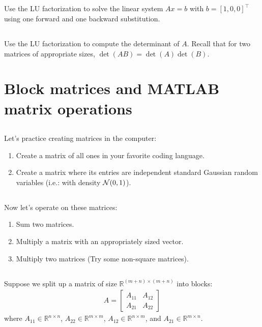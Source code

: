 \documentclass[11pt,letterpaper]{article}
\begin{document}
\subsection{}
Use the LU factorization to solve the linear system $Ax=b$ with
  $b=[1, 0, 0]^\top$ using one forward and one backward substitution.
  
\subsection{}\label{sec:1c}
Use the LU factorization to compute the determinant of
  $A$. Recall that for two matrices of appropriate sizes,
  $\det(AB)=\det(A)\det(B)$.
  

\newpage
\section{Block matrices and MATLAB matrix operations}
\subsection{}
Let's practice creating matrices in the computer:
\begin{enumerate}
    \item Create a matrix of all ones in your favorite coding language.
    \item Create a matrix where its entries are independent standard Gaussian random variables (i.e.: with density $\mathcal{N}(0,1)$). 
\end{enumerate}

\subsection{}
Now let's operate on these matrices:
\begin{enumerate}
    \item Sum two matrices.
    \item Multiply a matrix with an appropriately sized vector.
    \item Multiply two matrices (Try some non-square matrices).
\end{enumerate}

\subsection{}
Suppose we split up a matrix of size $\mathbb{R}^{(m+n)\times(m+n)}$ into blocks:
\begin{align*}
    A = \left[\begin{array}{c|c} A_{11} & A_{12} \\\hline A_{21} & A_{22} \end{array}\right]
\end{align*}
where $A_{11}\in\mathbb{R}^{n\times n}$, $A_{22}\in\mathbb{R}^{m\times m}$, $A_{12}\in\mathbb{R}^{n\times m}$, and $A_{21}\in\mathbb{R}^{m\times n}$. 
\end{document}
